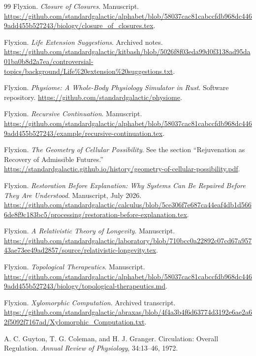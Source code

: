 \documentclass[11pt,openany]{book}
\theoremstyle{definition}
\theoremstyle{remark}
\begin{document}
\begin{thebibliography}{99}
Flyxion. \emph{Closure of Closures}. Manuscript.
\url{https://github.com/standardgalactic/alphabet/blob/58037cac81cabccfdb968dc4469add455b527243/biology/closure_of_closures.tex}.

Flyxion. \emph{Life Extension Suggestions}. Archived notes.
\url{https://github.com/standardgalactic/kitbash/blob/5026f8f03eda99d0f3138ad95da01ba0b8d2a7ea/controversial-topics/background/Life%20extension%20suggestions.txt}.

Flyxion. \emph{Physiome: A Whole-Body Physiology Simulator in Rust}.
Software repository.
\url{https://github.com/standardgalactic/physiome}.

Flyxion. \emph{Recursive Continuation}. Manuscript.
\url{https://github.com/standardgalactic/alphabet/blob/58037cac81cabccfdb968dc4469add455b527243/example/recursive-continuation.tex}.

Flyxion. \emph{The Geometry of Cellular Possibility}.
See the section ``Rejuvenation as Recovery of Admissible Futures.''
\url{https://standardgalactic.github.io/history/geometry-of-cellular-possibility.pdf}.

Flyxion. \emph{Restoration Before Explanation: Why Systems Can Be
Repaired Before They Are Understood}. Manuscript, July 2026.
\url{https://github.com/standardgalactic/calculus/blob/5ce306f7e687ca44eaf4db1d5666de8f9c183bc5/processing/restoration-before-explanation.tex}.

Flyxion. \emph{A Relativistic Theory of Longevity}. Manuscript.
\url{https://github.com/standardgalactic/laboratory/blob/710bcc0a22892c07cd67a95743ae73ee49ad2857/source/relativistic-longevity.tex}.

Flyxion. \emph{Topological Therapeutics}. Manuscript.
\url{https://github.com/standardgalactic/alphabet/blob/58037cac81cabccfdb968dc4469add455b527243/biology/topological-therapeutics.md}.

Flyxion. \emph{Xylomorphic Computation}. Archived transcript.
\url{https://github.com/standardgalactic/abraxas/blob/4f4a3b4f6d63774d3192e6ae2a62f5092f7167ad/Xylomorphic_Computation.txt}.

 A. C. Guyton, T. G. Coleman, and H. J. Granger. Circulation: Overall Regulation. \emph{Annual Review of Physiology}, 34:13--46, 1972.


\end{thebibliography}
\end{document}
